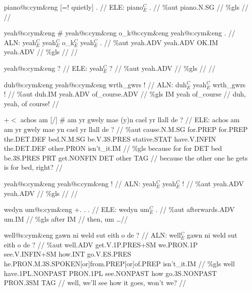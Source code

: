 \documentclass[a4paper,10pt]{article}
\begin{document}
\ex
\begingl[lingstyle=gergl]
\glchat piano@s:cym\&eng [=! quietly] . //
\glsurface ELE:  piano$^{C}_{E}$ .  //
\glauto \%aut  piano{\scriptsize .N.SG}   //
\glmanual \%gls     //
\gleng  //
\endgl
\xe

\ex
\begingl[lingstyle=gergl]
\glchat yeah@s:cym\&eng \# yeah@s:cym\&eng o\_k@s:cym\&eng yeah@s:cym\&eng . //
\glsurface ALN:  yeah$^{C}_{E}$ yeah$^{C}_{E}$ o\_k$^{C}_{E}$ yeah$^{C}_{E}$ .  //
\glauto \%aut  yeah{\scriptsize .ADV} yeah{\scriptsize .ADV} OK{\scriptsize .IM} yeah{\scriptsize .ADV}   //
\glmanual \%gls        //
\gleng  //
\endgl
\xe

\ex
\begingl[lingstyle=gergl]
\glchat yeah@s:cym\&eng ? //
\glsurface ELE:  yeah$^{C}_{E}$ ?  //
\glauto \%aut  yeah{\scriptsize .ADV}   //
\glmanual \%gls     //
\gleng  //
\endgl
\xe

\ex
\begingl[lingstyle=gergl]
\glchat duh@s:cym\&eng yeah@s:cym\&eng wrth\_gwrs ! //
\glsurface ALN:  duh$^{C}_{E}$ yeah$^{C}_{E}$ wrth\_gwrs !  //
\glauto \%aut  duh{\scriptsize .IM} yeah{\scriptsize .ADV} of\_course{\scriptsize .ADV}   //
\glmanual \%gls  IM yeah of\_course   //
\gleng duh, yeah, of course! //
\endgl
\xe

\ex
\begingl[lingstyle=gergl]
\glchat +$<$ achos am [/] \# am yr gwely mae (y)n cael yr llall de ? //
\glsurface ELE:  achos am am yr gwely mae yn cael yr llall de ?  //
\glauto \%aut  cause{\scriptsize .N.M.SG} for{\scriptsize .PREP} for{\scriptsize .PREP} the{\scriptsize .DET.DEF} bed{\scriptsize .N.M.SG} be{\scriptsize .V.3S.PRES} stative{\scriptsize .STAT} have{\scriptsize .V.INFIN} the{\scriptsize .DET.DEF} other{\scriptsize .PRON} isn't\_it{\scriptsize .IM}   //
\glmanual \%gls  because for for DET bed be{\scriptsize .3S.PRES} PRT get{\scriptsize .NONFIN} DET other TAG   //
\gleng because the other one he gets is for bed, right? //
\endgl
\xe

\ex
\begingl[lingstyle=gergl]
\glchat yeah@s:cym\&eng yeah@s:cym\&eng ! //
\glsurface ALN:  yeah$^{C}_{E}$ yeah$^{C}_{E}$ !  //
\glauto \%aut  yeah{\scriptsize .ADV} yeah{\scriptsize .ADV}   //
\glmanual \%gls      //
\gleng  //
\endgl
\xe

\ex
\begingl[lingstyle=gergl]
\glchat wedyn um@s:cym\&eng +. . . //
\glsurface ELE:  wedyn um$^{C}_{E}$ .  //
\glauto \%aut  afterwards{\scriptsize .ADV} um{\scriptsize .IM}   //
\glmanual \%gls  after IM   //
\gleng then, um \dots  //
\endgl
\xe

\ex
\begingl[lingstyle=gergl]
\glchat well@s:cym\&eng gawn ni weld sut eith o de ? //
\glsurface ALN:  well$^{C}_{E}$ gawn ni weld sut eith o de ?  //
\glauto \%aut  well{\scriptsize .ADV} get{\scriptsize .V.1P.PRES+SM} we{\scriptsize .PRON.1P} see{\scriptsize .V.INFIN+SM} how{\scriptsize .INT} go{\scriptsize .V.ES.PRES} he{\scriptsize .PRON.M.3S.SPOKEN[or]from.PREP[or]of.PREP} isn't\_it{\scriptsize .IM}   //
\glmanual \%gls  well have{\scriptsize .1PL.NONPAST} PRON{\scriptsize .1PL} see{\scriptsize .NONPAST} how go{\scriptsize .3S.NONPAST} PRON{\scriptsize .3SM} TAG   //
\gleng well, we'll see how it goes, won't we? //
\endgl
\xe
\end{document}
